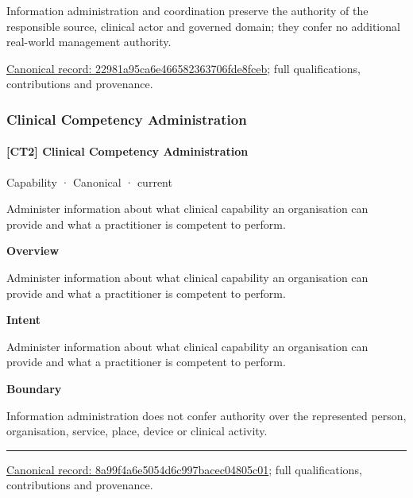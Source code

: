 Information administration and coordination preserve the authority of the responsible source, clinical actor and governed domain; they confer no additional real-world management authority.


{\footnotesize \href{../../../../continuum/strategy/capability/22981a95ca6e466582363706fde8fceb.md}{Canonical record: 22981a95ca6e466582363706fde8fceb}; full qualifications, contributions and provenance.}\par
\subsubsection{Clinical Competency Administration}

\paragraph{[CT2] Clinical Competency Administration}

\label{element:8a99f4a6e5054d6c997bacec04805c01}
{\small Capability · Canonical · current}\par

Administer information about what clinical capability an organisation can provide and what a practitioner is competent to perform.



\textbf{Overview}



Administer information about what clinical capability an organisation can provide and what a practitioner is competent to perform.



\textbf{Intent}



Administer information about what clinical capability an organisation can provide and what a practitioner is competent to perform.



\textbf{Boundary}



Information administration does not confer authority over the represented person, organisation, service, place, device or clinical activity.



\medskip\hrule\medskip

{\footnotesize \href{../../../../continuum/strategy/capability/8a99f4a6e5054d6c997bacec04805c01.md}{Canonical record: 8a99f4a6e5054d6c997bacec04805c01}; full qualifications, contributions and provenance.}\par
